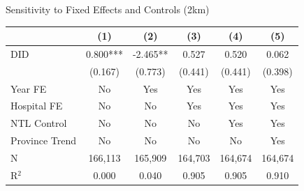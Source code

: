 \documentclass{beamer}
\begin{document}

\begin{frame}{Sensitivity to Fixed Effects and Controls (2km)}

\centering
\footnotesize
\setlength{\tabcolsep}{2pt}

\begin{table}[htbp]
\centering

\begin{tabular}{lccccc}
\toprule
& (1) & (2) & (3) & (4) & (5) \\
\midrule

DID
& 0.800***
& -2.465**
& 0.527
& 0.520
& 0.062 \\
& (0.167)
& (0.773)
& (0.441)
& (0.441)
& (0.398) \\

\midrule

Year FE
& No & Yes & Yes & Yes & Yes \\

Hospital FE
& No & No & Yes & Yes & Yes \\

NTL Control
& No & No & No & Yes & Yes \\

Province Trend
& No & No & No & No & Yes \\

\midrule

N
& 166,113
& 165,909
& 164,703
& 164,674
& 164,674 \\

R$^{2}$
& 0.000
& 0.040
& 0.905
& 0.905
& 0.910 \\

\bottomrule
\end{tabular}

\end{table}

\end{frame}
\end{document}
